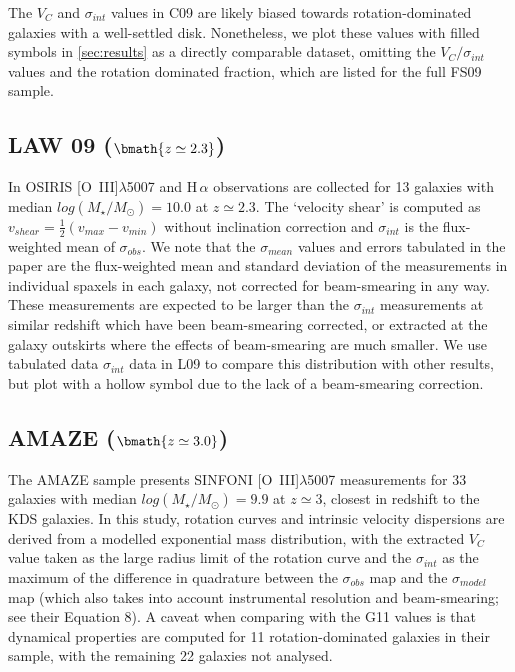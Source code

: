 \documentclass[fleqn,usenatbib]{mnras}
\begin{document}
The $V_{C}$ and $\sigma_{int}$ values in C09 are likely biased towards rotation-dominated galaxies with a well-settled disk.
Nonetheless, we plot these values with filled symbols in \cref{sec:results} as a directly comparable dataset, omitting the $V_{C}/\sigma_{int}$ values and the rotation dominated fraction, which are listed for the full FS09 sample.

\subsection{LAW 09 ($\bmath{z\simeq2.3}$)}\label{subsec:law_09}
In \cite[L09]{Law2009} OSIRIS [O~{\sc III}]$\lambda$5007 and H$\,\alpha$ observations are collected for 13 galaxies with median $log(M_{\star}/M_{\odot})=10.0$ at $z\simeq2.3$.
The `velocity shear' is computed as $v_{shear} = \frac{1}{2}(v_{max} - v_{min})$ without inclination correction and $\sigma_{int}$ is the flux-weighted mean of $\sigma_{obs}$.
We note that the $\sigma_{mean}$ values and errors tabulated in the \cite{Law2009} paper are the flux-weighted mean and standard deviation of the measurements in individual spaxels in each galaxy, not corrected for beam-smearing in any way.
These measurements are expected to be larger than the $\sigma_{int}$ measurements at similar redshift which have been beam-smearing corrected, or extracted at the galaxy outskirts where the effects of beam-smearing are much smaller.
We use tabulated data $\sigma_{int}$ data in L09 to compare this distribution with other results, but plot with a hollow symbol due to the lack of a beam-smearing correction.

\subsection{AMAZE ($\bmath{z\simeq3.0}$)}\label{subsec:AMAZE}
The AMAZE sample \cite[G11]{Gnerucci2011} presents SINFONI [O~{\sc III}]$\lambda$5007 measurements for 33 galaxies with median $log(M_{\star}/M_{\odot})=9.9$ at $z\simeq3$, closest in redshift to the KDS galaxies.
In this study, rotation curves and intrinsic velocity dispersions are derived from a modelled exponential mass distribution, with the extracted $V_{C}$ value taken as the large radius limit of the rotation curve and the $\sigma_{int}$ as the maximum of the difference in quadrature between the $\sigma_{obs}$ map and the $\sigma_{model}$ map (which also takes into account instrumental resolution and beam-smearing; see their Equation 8).
A caveat when comparing with the G11 values is that dynamical properties are computed for 11 rotation-dominated galaxies in their sample, with the remaining 22 galaxies not analysed. \\
\end{document}
